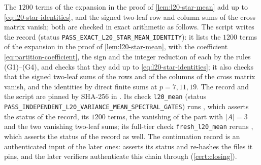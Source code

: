\begin{certificate}\label{cert:l20-star-mean}
The $1200$ terms of the expansion in the proof of
\cref{lem:l20-star-mean} add up to
\eqref{eq:l20-star-identities}, and the signed two-leaf row and
column sums of the cross matrix vanish; both are checked in exact
arithmetic as follows. The script
writes the record
(status \texttt{PASS\_EXACT\_L20\_STAR\_MEAN\_IDENTITY}): it lists the $1200$ terms
of the expansion in the proof of \cref{lem:l20-star-mean}, with the coefficient
\eqref{eq:partition-coefficient}, the sign and the integer reduction of each by
the rules (G1)--(G4), and checks that they add up to
\eqref{eq:l20-star-identities}; it also checks that the signed two-leaf sums of
the rows and of the columns of the cross matrix vanish, and the identities by
direct finite sums at $p=7,11,19$. The record and the script are pinned by
SHA-256 in .
Its check \texttt{l20\_mean} (status
\texttt{PASS\_INDEPENDENT\_L20\_VARIANCE\_MEAN\_SPECTRAL\_GATES}) runs
,
which asserts the status of the record, its $1200$ terms, the vanishing of the
part with $|A|=3$ and the two vanishing two-leaf sums; its full-tier check
\texttt{fresh\_l20\_mean} reruns
,
which asserts the status of the record as well. The continuation record is an
authenticated input of the later ones: 
asserts its status and re-hashes the files it pins, and the later verifiers authenticate this chain through
 (\cref{cert:closing}).
\end{certificate}

